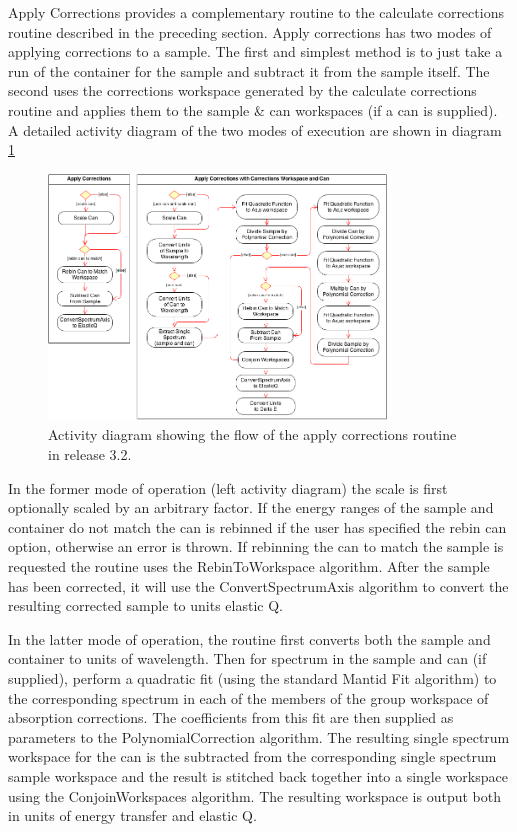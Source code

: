 \documentclass[paper=a4, fontsize=11pt]{scrartcl}	%
\numberwithin{equation}{section}															%
\numberwithin{figure}{section}																%
\numberwithin{table}{section}																%
\begin{document}
Apply Corrections provides a complementary routine to the calculate corrections routine described in the preceding section. Apply corrections has two modes of applying corrections to a sample. The first and simplest method is to just take a run of the container for the sample and subtract it from the sample itself. The second uses the corrections workspace generated by the calculate corrections routine and applies them to the sample \& can workspaces (if a can is supplied). A detailed activity diagram of the two modes of execution are shown in diagram \ref{fig:applycorr-activity-diagram}

\begin{figure}[H]
\centering
\includegraphics[width=0.8\textwidth]{img/uml/activity_diagrams/ApplyCorr_activity.png}
\caption{Activity diagram showing the flow of the apply corrections routine in release 3.2.}
\label{fig:applycorr-activity-diagram}
\end{figure}

In the former mode of operation (left activity diagram) the scale is first optionally scaled by an arbitrary factor. If the energy ranges of the sample and container do not match the can is rebinned if the user has specified the rebin can option, otherwise an error is thrown. If rebinning the can to match the sample is requested the routine uses the RebinToWorkspace algorithm. After the sample has been corrected, it will use the ConvertSpectrumAxis algorithm to convert the resulting corrected sample to units elastic Q.

In the latter mode of operation, the routine first converts both the sample and container to units of wavelength. Then for spectrum in the sample and can (if supplied), perform a quadratic fit (using the standard Mantid Fit algorithm) to the corresponding spectrum in each of the members of the group workspace of absorption corrections. The coefficients from this fit are then supplied as parameters to the PolynomialCorrection algorithm. The resulting single spectrum workspace for the can is the subtracted from the corresponding single spectrum sample workspace and the result is stitched back together into a single workspace using the ConjoinWorkspaces algorithm. The resulting workspace is output both in units of energy transfer and elastic Q.
\end{document}
